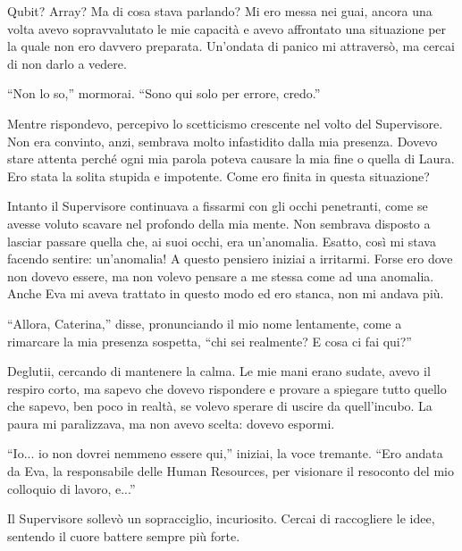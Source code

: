 Qubit? Array? Ma di cosa stava parlando? Mi ero messa nei guai, ancora una volta avevo sopravvalutato le mie capacità e avevo affrontato una situazione per la quale non ero davvero preparata.
Un'ondata di panico mi attraversò, ma cercai di non darlo a vedere.

\begin{dialogue}
 \enquote{Non lo so,} mormorai. \enquote{Sono qui solo per errore, credo.}
\end{dialogue}

Mentre rispondevo, percepivo lo scetticismo crescente nel volto del Supervisore. Non era convinto, anzi, sembrava molto infastidito dalla mia presenza.  Dovevo stare attenta perché ogni mia parola poteva  causare la mia fine o quella di Laura. Ero stata la solita stupida e impotente. Come ero finita in questa situazione?

Intanto il Supervisore continuava a fissarmi con gli occhi penetranti, come se avesse voluto scavare nel profondo della mia mente. Non sembrava disposto a lasciar passare quella che, ai suoi occhi, era un'anomalia. Esatto, così mi stava facendo sentire: un'anomalia! A questo pensiero iniziai a irritarmi. Forse ero dove non dovevo essere, ma non volevo pensare a me stessa come ad una anomalia. Anche Eva mi aveva trattato in questo modo ed ero stanca, non mi andava più.

\begin{dialogue}
 \enquote{Allora, Caterina,} disse, pronunciando il mio nome lentamente, come a rimarcare la mia presenza sospetta, \enquote{chi sei realmente? E cosa ci fai qui?}
\end{dialogue}

Deglutii, cercando di mantenere la calma. Le mie mani erano sudate, avevo il respiro corto, ma sapevo che dovevo rispondere e provare a spiegare tutto quello che sapevo, ben poco in realtà, se volevo sperare di uscire da quell'incubo. La paura mi paralizzava, ma non avevo scelta: dovevo espormi.

\begin{dialogue}
 \enquote{Io... io non dovrei nemmeno essere qui,} iniziai, la voce tremante. \enquote{Ero andata da Eva, la responsabile delle Human Resources, per visionare il resoconto del mio colloquio di lavoro, e...}
\end{dialogue}

Il Supervisore sollevò un sopracciglio, incuriosito. Cercai di raccogliere le idee, sentendo il cuore battere sempre più forte.

